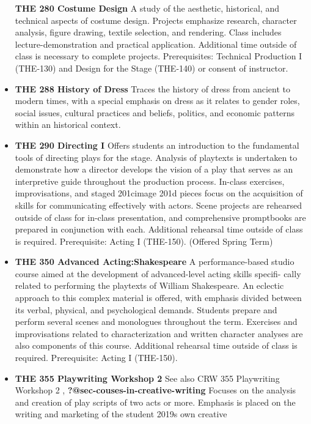 \documentclass[
  letterpaper,
]{scrbook}
\begin{document}
\begin{itemize}
  \textbf{THE 280 Costume Design} A study of the aesthetic, historical,
  and technical aspects of costume design. Projects emphasize research,
  character analysis, figure drawing, textile selection, and rendering.
  Class includes lecture-demonstration and practical application.
  Additional time outside of class is necessary to complete projects.
  Prerequisites: Technical Production I (THE-130) and Design for the
  Stage (THE-140) or consent of instructor.\\
\item
  \textbf{THE 288 History of Dress} Traces the history of dress from
  ancient to modern times, with a special emphasis on dress as it
  relates to gender roles, social issues, cultural practices and
  beliefs, politics, and economic patterns within an historical context.
\item
  \textbf{THE 290 Directing I} Offers students an introduction to the
  fundamental tools of directing plays for the stage. Analysis of
  playtexts is undertaken to demonstrate how a director develops the
  vision of a play that serves as an interpretive guide throughout the
  production process. In-class exercises, improvisations, and staged
  201cimage 201d pieces focus on the acquisition of skills for
  communicating effectively with actors. Scene projects are rehearsed
  outside of class for in-class presentation, and comprehensive
  promptbooks are prepared in conjunction with each. Additional
  rehearsal time outside of class is required. Prerequisite: Acting I
  (THE-150). (Offered Spring Term)\\
\item
  \textbf{THE 350 Advanced Acting:Shakespeare} A performance-based
  studio course aimed at the development of advanced-level acting skills
  specifi- cally related to performing the playtexts of William
  Shakespeare. An eclectic approach to this complex material is offered,
  with emphasis divided between its verbal, physical, and psychological
  demands. Students prepare and perform several scenes and monologues
  throughout the term. Exercises and improvisations related to
  characterization and written character analyses are also components of
  this course. Additional rehearsal time outside of class is required.
  Prerequisite: Acting I (THE-150).
\item
  \textbf{THE 355 Playwriting Workshop 2} See also CRW 355 Playwriting
  Workshop 2 , \textbf{?@sec-couses-in-creative-writing} Focuses on the
  analysis and creation of play scripts of two acts or more. Emphasis is
  placed on the writing and marketing of the student 2019s own creative

\end{itemize}
\end{document}
